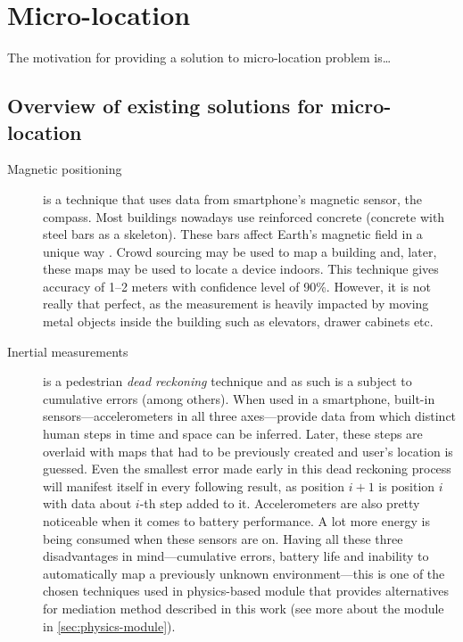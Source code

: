 \chapter{Micro-location}
\label{cha:motivation}


The motivation for providing a solution to micro-location problem is\ldots {}

\section{Overview of existing solutions for micro-location}
\label{sec:existing-uloc}

\begin{description}
	\item[Magnetic positioning] is a technique that uses data from smartphone's magnetic sensor, the compass. Most buildings nowadays use reinforced concrete (concrete with steel bars as a skeleton). These bars affect Earth's magnetic field in a unique way \cite{Haverinen:magnetic}. Crowd sourcing may be used to map a building and, later, these maps may be used to locate a device indoors. This technique gives accuracy of 1--2 meters with confidence level of 90\%. However, it is not really that perfect, as the measurement is heavily impacted by moving metal objects inside the building such as elevators, drawer cabinets etc.
	
	\item[Inertial measurements] is a pedestrian \emph{dead reckoning} technique and as such is a subject to cumulative errors (among others). When used in a smartphone, built-in sensors---accelerometers in all three axes---provide data from which distinct human steps in time and space can be inferred. Later, these steps are overlaid with maps that had to be previously created and user's location is guessed. Even the smallest error made early in this dead reckoning process will manifest itself in every following result, as position $i+1$ is position $i$ with data about $i$-th step added to it. Accelerometers are also pretty noticeable when it comes to battery performance. A lot more energy is being consumed when these sensors are on. Having all these three disadvantages in mind---cumulative errors, battery life and inability to automatically map a previously unknown environment---this is one of the chosen techniques used in physics-based module that provides alternatives for mediation method described in this work (see more about the module in \cref{sec:physics-module}).
	

\end{description}
